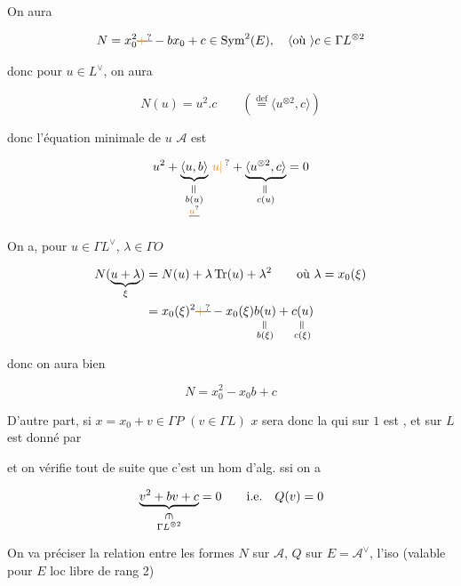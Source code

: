 On aura

\[ N=x_0^2\deleted{\unsure{+}}-bx_0+c\in\operatorname{Sym}^2(E),\quad\inserted{\text{où }}c\in\Gamma L^{\otimes2} \]

donc pour $u\in L^\vee$, on aura

\[ N(u)=u^2.c\qquad(\overset{\mathrm{def}}{=}\langle u^{\otimes2},c\rangle) \]

donc l'équation minimale de $u$  $\mathcal{A}$ est

\[ u^2+\underbrace{\langle u,b\rangle}_{\substack{\rotatebox{90}{$=$}\\ b(u)\\\deleted{\unsure{u}}}}\,\unsure{u|\,}+\underbrace{\langle u^{\otimes2},c\rangle}_{\substack{\rotatebox{90}{$=$}\\c(u)}}=0 \]


On a, pour $u\in\Gamma L^\vee$, $\lambda\in\Gamma O$

\[ \begin{aligned}N(\underbrace{u+\lambda}_{\xi})&=N(u)+\lambda\operatorname{Tr}(u)+\lambda^2\qquad\text{où }\lambda=x_0(\xi)\\ &=x_0(\xi)^2\deleted{\unsure{+}}-x_0(\xi)\underset{\substack{\rotatebox{90}{$=$}\\b(\xi)}}{b(u)}+\underset{\substack{\rotatebox{90}{$=$}\\c(\xi)}}{c(u)}\end{aligned} \]

donc on aura bien

\[ N=x_0^2-x_0 b+c \]

D'autre part, si $x=x_0+v\in\Gamma P$ \quad $(v\in\Gamma L)$  $x$ sera donc la    qui sur $1$ est , et sur $L$  est donné par


et on vérifie tout de suite que c'est un hom d'alg. ssi on a

\[ \underbrace{v^2+bv+c}_{\substack{\rotatebox{-90}{$\in$}\\\Gamma L^{\otimes2}}}=0\qquad\text{i.e.}\quad Q(v)=0 \]

On va préciser la relation entre les formes $N$ sur $\mathcal A$, $Q$ sur $E=\mathcal A^\vee$,   l'iso (valable pour  $E$ loc libre de rang 2)

